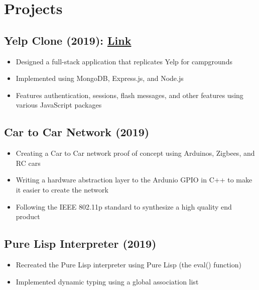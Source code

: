 \documentclass[10pt]{article}
\begin{document}
\section{Projects}
\begin{multicols}{2}
\subsection{Yelp Clone (2019): \href{https://github.com/brandonhawi/YelpCamp}{Link}}

\begin{itemize}
	\setlength\itemsep{0em}
	\item Designed a full-stack application that replicates Yelp for campgrounds
	\item Implemented using MongoDB, Express.js, and Node.js
	\item Features authentication, sessions, flash messages, and other features using various JavaScript packages
\end{itemize}

\subsection{Car to Car Network (2019)}

\begin{itemize}
	\setlength\itemsep{0em}
	\item Creating a Car to Car network proof of concept using Arduinos, Zigbees, and RC cars
	\item Writing a hardware abstraction layer to the Ardunio GPIO in C++ to make it easier to create the network
	\item Following the IEEE 802.11p standard to synthesize a high quality end product
\end{itemize}

\subsection{Pure Lisp Interpreter (2019)}

\begin{itemize}
	\setlength\itemsep{0em}
	\item Recreated the Pure Lisp interpreter using Pure Lisp (the eval() function)
	\item Implemented dynamic typing using a global association list
\end{itemize}

\vfill\null
\columnbreak


\end{multicols}
\end{document}

